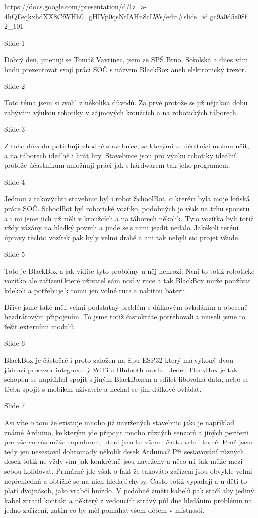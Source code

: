 https://docs.google.com/presentation/d/1z_a-4hQFeqkxhdXX8CfWHh0_gHIVp0qsNtIAHn8cLWs/edit#slide=id.gc9a0d5e08f_2_101

Slide 1

Dobrý den, jmenuji se Tomáš Vavrinec, jsem ze SPŠ Brno, Sokolská
a dnes vám budu prezentovat 
svojí práci SOČ s názvem BlackBox aneb elektronický trezor.

Slide 2

Toto téma jsem si zvolil z několika důvodů. Za prvé protože se již nějakou dobu zabývám 
výukou robotiky v zájmových kroužcích a na robotických táborech. 

Slide 3

Z toho důvodu potřebuji 
vhodné stavebnice, se kterými se účastníci mohou učit, a na táborech ideálně i hrát hry.
Stavebnice jsou pro výuku robotiky ideální, protože účastníkům umožňují práci jak 
s hárdwarem tak jeho programem.

Slide 4

Jednou z takovýchto stavebnic byl i robot SchoolBot, o kterém byla moje loňská práce SOČ.
SchoolBot byl roborické vozítko, podobných je však na trhu spoustu a i mi jsme jich již měli v kroužcích
a na táborech několik. Tyto vozítka byli totiž vždy vázány na hladký povrch a jinde se s nimi jezdit nedalo.
Jakékoli teréní úpravy těchto vozítek pak byly velmi drahé a ani tak nebyli sto projet všude.

Slide 5

Toto je BlackBox a jak vidíte tyto problémy u něj nehrozí. Není to totiž robotické vozítko ale zařízení které uživatel
sám nosí v ruce a tak BlackBox muže používat kdekoli a potřebuje k tomu jen volné ruce a nabitou baterii.

Dříve jsme také měli velmi podstatný problém s dálkovým ovládáním a obeceně bezdrátovým připojením.
To jsme totiž častokráte potřebovali a museli jsme to řešit externími modulů.

Slide 6

BlackBox je částečně i proto založen na čipu ESP32 který má výkoný dvou jádroví procesor integrovaný WiFi a Blutooth modul. 
Jeden BlackBox je tak schopen se například spojit s jiným BlackBoxem a sdílet libovolná data, 
nebo se třeba spojit s mobilem uživatele a nechat se jím dálkově ovládat. %

Slide 7

Asi víte o tom že existuje mnoho již navržených stavebnic jako je například známé Arduino, 
ke kterým jde připojit mnoho různých senzorů a jiných periferii pro vše co vás může napadnout, které jsou ke všemu 
často velmi levné. 
Proč jsem tedy jen nesestavil dohromady několik desek Arduina? Při sestavování různých desek
totiž ne vždy vím jak konkrétně jsou navrženy a něco mi tak může mezi sebou kolidovat.
Primárně jde však o fakt že takováto zařízení jsou obvykle velmi nepřehledná a obtížně 
se na nich hledají chyby. Často totiž vypadají a u dětí to platí dvojnásob, jako vrabčí hnízdo.
V podobné změti kabelů pak stačí aby jediný kabel ztratil kontakt a některý z vedoucích 
strávý půl dne hledáním problému na jedno zařízení, zatím co by měl pomáhat všem dětem v místnosti.

